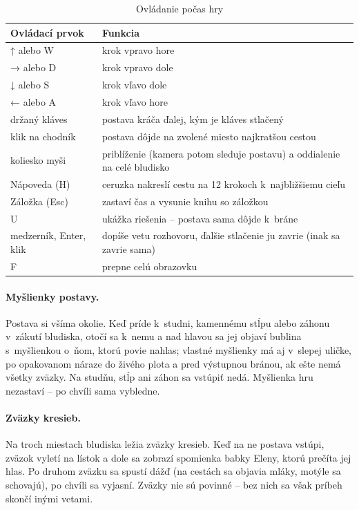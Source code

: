 \documentclass[11pt, a4paper]{article}
\begin{document}
\begin{table}[H]
  \centering
  \caption{Ovládanie počas hry}
  \begin{tabularx}{\textwidth}{@{}lX@{}}
    \toprule
    \textbf{Ovládací prvok} & \textbf{Funkcia} \\ \midrule
    ↑ alebo W & krok vpravo hore \\
    → alebo D & krok vpravo dole \\
    ↓ alebo S & krok vľavo dole \\
    ← alebo A & krok vľavo hore \\
    držaný kláves & postava kráča ďalej, kým je kláves stlačený \\
    klik na chodník & postava dôjde na zvolené miesto najkratšou cestou \\
    koliesko myši & priblíženie (kamera potom sleduje postavu) a oddialenie na celé bludisko \\
    Nápoveda (H) & ceruzka nakreslí cestu na 12 krokoch k~najbližšiemu cieľu \\
    Záložka (Esc) & zastaví čas a vysunie knihu so záložkou \\
    U & ukážka riešenia – postava sama dôjde k~bráne \\
    medzerník, Enter, klik & dopíše vetu rozhovoru, ďalšie stlačenie ju zavrie (inak sa zavrie sama) \\
    F & prepne celú obrazovku \\ \bottomrule
  \end{tabularx}
\end{table}

\paragraph{Myšlienky postavy.} Postava si všíma okolie. Keď príde k~studni, kamennému stĺpu
alebo záhonu v~zákutí bludiska, otočí sa k~nemu a nad hlavou sa jej objaví bublina s~myšlienkou
o~ňom, ktorú povie nahlas; vlastné myšlienky má aj v~slepej uličke, po opakovanom náraze do živého plota a pred
výstupnou bránou, ak ešte nemá všetky zväzky. Na studňu, stĺp ani záhon sa vstúpiť nedá.
Myšlienka hru nezastaví – po chvíli sama vybledne.

\paragraph{Zväzky kresieb.} Na troch miestach bludiska ležia zväzky kresieb. Keď na ne postava
vstúpi, zväzok vyletí na lístok a dole sa zobrazí spomienka babky Eleny, ktorú prečíta jej hlas. Po druhom zväzku sa
spustí dážď (na cestách sa objavia mláky, motýle sa schovajú), po chvíli sa vyjasní. Zväzky nie
sú povinné – bez nich sa však príbeh skončí inými vetami.
\end{document}
